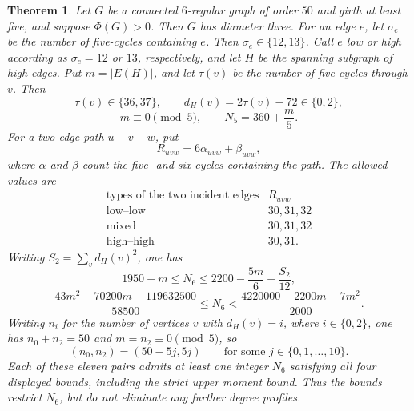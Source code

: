 \documentclass[a4paper,10pt,reqno]{amsart}
\theoremstyle{plain}
\newtheorem{theorem}{Theorem}[section]
\theoremstyle{definition}
\theoremstyle{remark}
\begin{document}
\begin{theorem}\label{thm:order50-feasibility}
Let \(G\) be a connected \(6\)-regular graph of order \(50\) and girth
at least five, and suppose \(\Phi(G)>0\).  Then \(G\) has diameter three.
For an edge \(e\), let \(\sigma_e\) be the number of five-cycles containing
\(e\).  Then \(\sigma_e\in\{12,13\}\).  Call \(e\) low or high according as
\(\sigma_e=12\) or \(13\), respectively, and let \(H\) be the spanning
subgraph of high edges.  Put \(m=|E(H)|\), and let \(\tau(v)\) be the number
of five-cycles through \(v\).  Then
\[
 \tau(v)\in\{36,37\},
 \qquad d_H(v)=2\tau(v)-72\in\{0,2\},
\]
\[
 m\equiv0\pmod5,
 \qquad N_5=360+\frac m5.
\]
For a two-edge path \(u-v-w\), put
\[
 R_{uvw}=6\alpha_{uvw}+\beta_{uvw},
\]
where \(\alpha\) and \(\beta\) count the five- and six-cycles containing the
path.  The allowed values are
\[
\begin{array}{c|c}
\text{types of the two incident edges}&R_{uvw}\\
\hline
\text{low--low}&30,31,32\\
\text{mixed}&30,31,32\\
\text{high--high}&30,31.
\end{array}
\]
Writing \(S_2=\sum_vd_H(v)^2\), one has
\[
 1950-m\le N_6
 \le2200-\frac{5m}{6}-\frac{S_2}{12},
\]
\[
 \frac{43m^2-70200m+119632500}{58500}
 \le N_6
 <\frac{4220000-2200m-7m^2}{2000}.
\]
Writing \(n_i\) for the number of vertices \(v\) with \(d_H(v)=i\), where
\(i\in\{0,2\}\), one has \(n_0+n_2=50\) and \(m=n_2\equiv0\pmod5\), so
\[
 (n_0,n_2)=(50-5j,5j)\qquad\text{for some }j\in\{0,1,\ldots,10\}.
\]
Each of these eleven pairs admits at least one integer \(N_6\) satisfying all
four displayed bounds, including the strict upper moment bound. Thus the
bounds restrict \(N_6\), but do not eliminate any further degree profiles.
\end{theorem}
\end{document}
